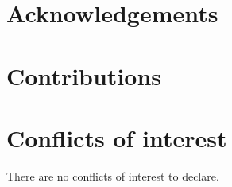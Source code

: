 \documentclass[9pt, twocolumn, lineno]{templates/pi/pi-article}
\begin{document}
\if{}
    
\fi\if{}
    
\fi\if{}
    
\fi\if{}
    
\fi



\if{}
    
\else
\section*{Acknowledgements}
    
\section*{Contributions}
    
\section*{Conflicts of interest}
There are no conflicts of interest to declare.
\fi



\end{document}
